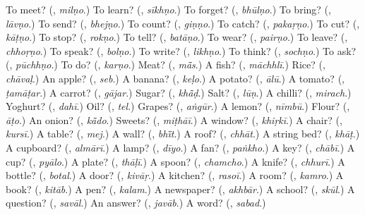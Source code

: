 \begin{tcolorbox}[breakable,colback=teal!4,colframe=teal!35!black,title={Before you move on}]
To meet? (\textbf{}, \emph{milṇo}.) To learn? (\textbf{}, \emph{sīkhṇo}.) To forget? (\textbf{}, \emph{bhūlṇo}.) To bring? (\textbf{}, \emph{lāvṇo}.) To send? (\textbf{}, \emph{bhejṇo}.) To count? (\textbf{}, \emph{giṇṇo}.) To catch? (\textbf{}, \emph{pakaṛṇo}.) To cut? (\textbf{}, \emph{kāṭṇo}.) To stop? (\textbf{}, \emph{rokṇo}.) To tell? (\textbf{}, \emph{batāṇo}.) To wear? (\textbf{}, \emph{pairṇo}.) To leave? (\textbf{}, \emph{chhoṛṇo}.) To speak? (\textbf{}, \emph{bolṇo}.) To write? (\textbf{}, \emph{likhṇo}.) To think? (\textbf{}, \emph{sochṇo}.) To ask? (\textbf{}, \emph{pūchhṇo}.) To do? (\textbf{}, \emph{karṇo}.) Meat? (\textbf{}, \emph{mā̃s}.) A fish? (\textbf{}, \emph{māchhlī}.) Rice? (\textbf{}, \emph{chāvaḷ}.) An apple? (\textbf{}, \emph{seb}.) A banana? (\textbf{}, \emph{keḷo}.) A potato? (\textbf{}, \emph{ālū}.) A tomato? (\textbf{}, \emph{ṭamāṭar}.) A carrot? (\textbf{}, \emph{gājar}.) Sugar? (\textbf{}, \emph{khā̃ḍ}.) Salt? (\textbf{}, \emph{lūṇ}.) A chilli? (\textbf{}, \emph{mirach}.) Yoghurt? (\textbf{}, \emph{dahī}.) Oil? (\textbf{}, \emph{tel}.) Grapes? (\textbf{}, \emph{aṅgūr}.) A lemon? (\textbf{}, \emph{nīmbū}.) Flour? (\textbf{}, \emph{āṭo}.) An onion? (\textbf{}, \emph{kā̃do}.) Sweets? (\textbf{}, \emph{miṭhāī}.) A window? (\textbf{}, \emph{khiṛkī}.) A chair? (\textbf{}, \emph{kursī}.) A table? (\textbf{}, \emph{mej}.) A wall? (\textbf{}, \emph{bhī̃t}.) A roof? (\textbf{}, \emph{chhāt}.) A string bed? (\textbf{}, \emph{khāṭ}.) A cupboard? (\textbf{}, \emph{almārī}.) A lamp? (\textbf{}, \emph{dīyo}.) A fan? (\textbf{}, \emph{paṅkho}.) A key? (\textbf{}, \emph{chābī}.) A cup? (\textbf{}, \emph{pyālo}.) A plate? (\textbf{}, \emph{thāḷī}.) A spoon? (\textbf{}, \emph{chamcho}.) A knife? (\textbf{}, \emph{chhurī}.) A bottle? (\textbf{}, \emph{botal}.) A door? (\textbf{}, \emph{kivāṛ}.) A kitchen? (\textbf{}, \emph{rasoī}.) A room? (\textbf{}, \emph{kamro}.) A book? (\textbf{}, \emph{kitāb}.) A pen? (\textbf{}, \emph{kalam}.) A newspaper? (\textbf{}, \emph{akhbār}.) A school? (\textbf{}, \emph{skūl}.) A question? (\textbf{}, \emph{savāl}.) An answer? (\textbf{}, \emph{javāb}.) A word? (\textbf{}, \emph{sabad}.)
\end{tcolorbox}
